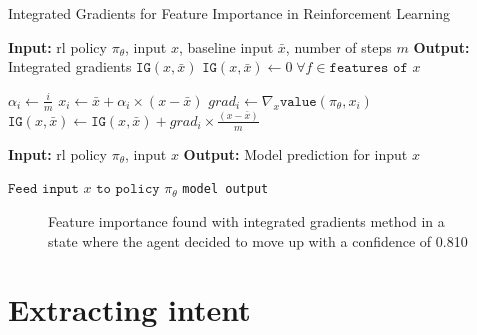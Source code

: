 \documentclass[UKenglish]{uiomasterthesis}
\begin{document}
\begin{algorithm}
\caption{Integrated Gradients for Feature Importance in Reinforcement Learning}
\label{alg:intgrad}
\begin{algorithmic}
    \State \textbf{Input:} \ac{rl} policy $\pi_\theta$, input $x$, baseline input $\bar{x}$, number of steps $m$
    \State \textbf{Output:} Integrated gradients $\texttt{IG}(x, \bar{x})$
    \State $\texttt{IG}(x, \bar{x}) \gets 0 \; \forall f \in \texttt{features of } x$ 
    
        \State $\alpha_i \gets \frac{i}{m}$
        \State $x_i \gets \bar{x} + \alpha_i \times (x - \bar{x})$
        \State $grad_i \gets \nabla_x \texttt{value}(\pi_\theta, x_i)$ 
        \State $\texttt{IG}(x, \bar{x}) \gets \texttt{IG}(x, \bar{x}) + grad_i \times \frac{(x - \bar{x})}{m}$
    \EndFor
    
        \State \textbf{Input:} \ac{rl} policy $\pi_\theta$, input $x$
        \State \textbf{Output:} Model prediction for input $x$
        
        \State $\texttt{Feed input } x \texttt{ to policy } \pi_\theta$
        \State \Return \texttt{model output}
    \EndFunction
\end{algorithmic}
\end{algorithm}

\begin{figure}[!ht]
	\caption{Feature importance found with integrated gradients method in a state where the agent decided to move up with a confidence of 0.810}
	\label{fig:intgrad} 
\end{figure}

\section{Extracting intent}
\end{document}
